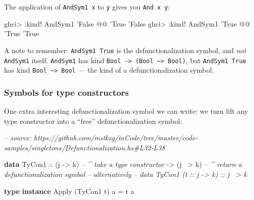 \documentclass[]{article}
\newenvironment{Shaded}{}{}
\newcommand{\CommentTok}[1]{\textcolor[rgb]{0.38,0.63,0.69}{\textit{#1}}}
\newcommand{\DataTypeTok}[1]{\textcolor[rgb]{0.56,0.13,0.00}{#1}}
\newcommand{\FunctionTok}[1]{\textcolor[rgb]{0.02,0.16,0.49}{#1}}
\newcommand{\KeywordTok}[1]{\textcolor[rgb]{0.00,0.44,0.13}{\textbf{#1}}}
\newcommand{\NormalTok}[1]{#1}
\newcommand{\OtherTok}[1]{\textcolor[rgb]{0.00,0.44,0.13}{#1}}
\begin{document}
The application of \texttt{AndSym1\ x} to \texttt{y} gives you
\texttt{And\ x\ y}:

\begin{Shaded}
\begin{Highlighting}[]
\NormalTok{ghci}\FunctionTok{>} \FunctionTok{:}\NormalTok{kind}\FunctionTok{!} \DataTypeTok{AndSym1}\NormalTok{ '}\DataTypeTok{False} \FunctionTok{@@}\NormalTok{ '}\DataTypeTok{True}
\NormalTok{'}\DataTypeTok{False}
\NormalTok{ghci}\FunctionTok{>} \FunctionTok{:}\NormalTok{kind}\FunctionTok{!} \DataTypeTok{AndSym1}\NormalTok{ '}\DataTypeTok{True}  \FunctionTok{@@}\NormalTok{ '}\DataTypeTok{True}
\NormalTok{'}\DataTypeTok{True}
\end{Highlighting}
\end{Shaded}

A note to remember: \texttt{AndSym1\ \textquotesingle{}True} is the
defunctionalization symbol, and \emph{not} \texttt{AndSym1} itself.
\texttt{AndSym1} has kind
\texttt{Bool\ -\textgreater{}\ (Bool\ \textasciitilde{}\textgreater{}\ Bool)},
but \texttt{AndSym1\ \textquotesingle{}True} has kind
\texttt{Bool\ \textasciitilde{}\textgreater{}\ Bool} --- the kind of a
defunctionalization symbol.

\hypertarget{symbols-for-type-constructors}{%
\subsubsection{Symbols for type
constructors}\label{symbols-for-type-constructors}}

One extra interesting defunctionalization symbol we can write: we turn lift any
type constructor into a ``free'' defunctionalization symbol:

\begin{Shaded}
\begin{Highlighting}[]
\CommentTok{-- source: https://github.com/mstksg/inCode/tree/master/code-samples/singletons/Defunctionalization.hs#L32-L38}

\KeywordTok{data} \DataTypeTok{TyCon1}
\OtherTok{        ::}\NormalTok{ (j }\OtherTok{->}\NormalTok{ k)     }\CommentTok{-- ^ take a type constructor}
        \OtherTok{->}\NormalTok{ (j }\FunctionTok{~>}\NormalTok{ k)     }\CommentTok{-- ^ return a defunctionalization symbol}
\CommentTok{-- alternatively}
\CommentTok{-- data TyCon1 (t :: j -> k) :: j ~> k}

\KeywordTok{type} \KeywordTok{instance} \DataTypeTok{Apply}\NormalTok{ (}\DataTypeTok{TyCon1}\NormalTok{ t) a }\FunctionTok{=}\NormalTok{ t a}
\end{Highlighting}
\end{Shaded}
\end{document}
